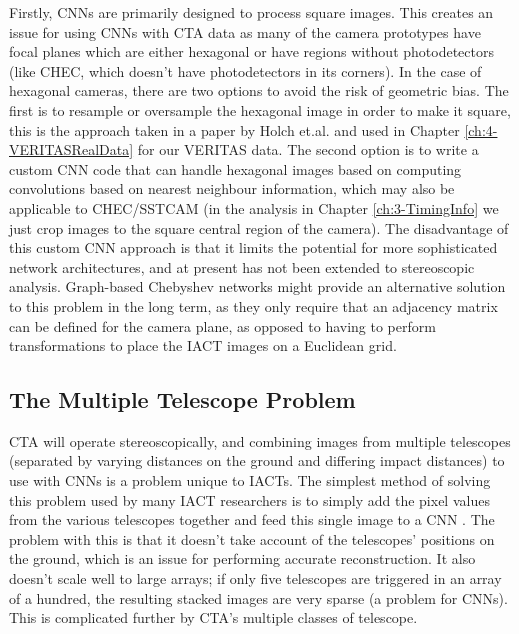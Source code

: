 Firstly, CNNs are primarily designed to process square images. This creates an issue for using CNNs with CTA data as many of the camera prototypes have focal planes which are either hexagonal or have regions without photodetectors (like CHEC, which doesn't have photodetectors in its corners). In the case of hexagonal cameras, there are two options to avoid the risk of geometric bias. The first is to resample or oversample the hexagonal image in order to make it square, this is the approach taken in a paper by Holch et.al. \cite{Hexagdly} and used in Chapter \ref{ch:4-VERITASRealData} for our VERITAS data. The second option is to write a custom CNN code that can handle hexagonal images based on computing convolutions based on nearest neighbour information, which may also be applicable to CHEC/SSTCAM (in the analysis in Chapter \ref{ch:3-TimingInfo} we just crop images to the square central region of the camera). The disadvantage of this custom CNN approach is that it limits the potential for more sophisticated network architectures, and at present has not been extended to stereoscopic analysis. Graph-based Chebyshev networks \cite{adithesis} might provide an alternative solution to this problem in the long term, as they only require that an adjacency matrix can be defined for the camera plane, as opposed to having to perform transformations to place the IACT images on a Euclidean grid. 

\subsection{The Multiple Telescope Problem}

CTA will operate stereoscopically, and combining images from multiple telescopes (separated by varying distances on the ground and differing impact distances) to use with CNNs is a problem unique to IACTs. The simplest method of solving this problem used by many IACT researchers is to simply add the pixel values from the various telescopes together and feed this single image to a CNN \cite{mangano}. The problem with this is that it doesn't take account of the telescopes' positions on the ground, which is an issue for performing accurate reconstruction. It also doesn't scale well to large arrays; if only five telescopes are triggered in an array of a hundred, the resulting stacked images are very sparse (a problem for CNNs). This is complicated further by CTA's multiple classes of telescope.

